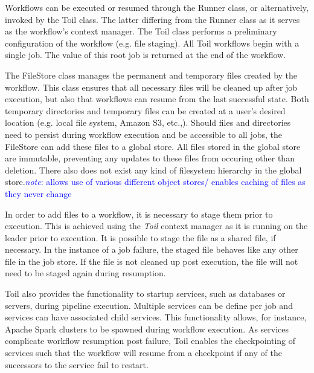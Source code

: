 \documentclass{report}
\newcommand{\note}[1]{\textcolor{blue}{\textit{note}: #1}}
\begin{document}
           Workflows can be executed or 
           resumed through the Runner class, or alternatively, invoked by the
           Toil class. The latter differing from the Runner class as it serves 
           as the workflow's context manager. The Toil class performs
           a preliminary configuration of the workflow (e.g. file staging).
           All Toil workflows begin with a single job. The value of this root 
           job is returned at the end of the workflow.

            The FileStore class manages the permanent and temporary files
            created by the workflow. This class ensures that all necessary files
            will be cleaned up after job execution, but also that workflows
            can resume from the last successful state. Both temporary 
            directories and temporary files can be created at a user's desired
            location (e.g. local file system, Amazon S3, etc.,). Should files
            and directories need to persist during workflow execution and
            be accessible to all jobs, the FileStore
            can add these files to a global store. All files stored in the 
            global store are immutable, preventing any updates to these files
            from occuring other than deletion. There also does not exist any
            kind of filesystem hierarchy in the global store.\note{allows use
            of various different object stores/ enables caching of files as they
            never change}

            In order to add files to a workflow, it is necessary to stage them
            prior to execution. This is achieved using the \textit{Toil} context
            manager as it is running on the leader prior to execution. It is 
            possible to stage the file as a shared file, if necessary. In the 
            instance of a job failure, the staged file behaves like any other 
            file in the job store. If the file is not cleaned up post execution,
            the file will not need to be staged again during resumption.

            Toil also provides the functionality to startup services, such as
            databases or servers, during pipeline execution. Multiple services
            can be define per job and services can have associated child
            services. This functionality allows, for instance, Apache Spark 
            clusters to be spawned during workflow execution. As services 
            complicate workflow resumption post failure, Toil enables the
            checkpointing of services such that the workflow will resume from a
            checkpoint if any of the successors to the service fail to restart.
\end{document}
